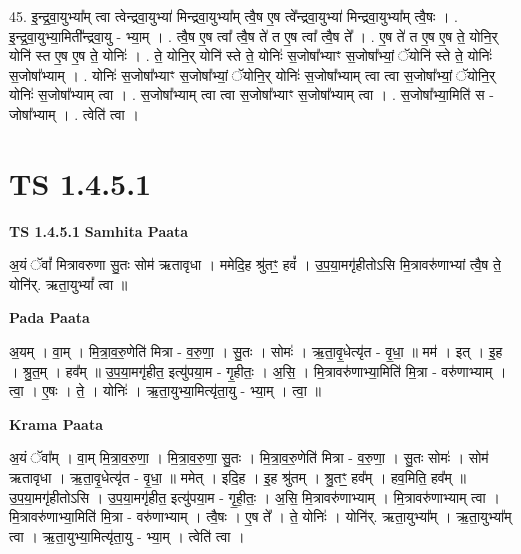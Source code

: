 \documentclass[17pt]{extarticle}
\begin{document}
45. इ॒न्द्र॒वा॒युभ्या᳚म् त्वा त्वेन्द्रवा॒युभ्या॑ मिन्द्रवा॒युभ्या᳚म् त्वै॒ष ए॒ष त्वे᳚न्द्रवा॒युभ्या॑ मिन्द्रवा॒युभ्या᳚म् त्वै॒षः । . इ॒न्द्र॒वा॒युभ्या॒मिती᳚न्द्रवा॒यु - भ्या॒म् । . त्वै॒ष ए॒ष त्वा᳚ त्वै॒ष ते॑ त ए॒ष त्वा᳚ त्वै॒ष ते᳚ । . ए॒ष ते॑ त ए॒ष ए॒ष ते॒ योनि॒र् योनि॑ स्त ए॒ष ए॒ष ते॒ योनिः॑ । . ते॒ योनि॒र् योनि॑ स्ते ते॒ योनिः॑ स॒जोषा᳚भ्याꣳ स॒जोषा᳚भ्यां॒ ॅयोनि॑ स्ते ते॒ योनिः॑ स॒जोषा᳚भ्याम् । . योनिः॑ स॒जोषा᳚भ्याꣳ स॒जोषा᳚भ्यां॒ ॅयोनि॒र् योनिः॑ स॒जोषा᳚भ्याम् त्वा त्वा स॒जोषा᳚भ्यां॒ ॅयोनि॒र् योनिः॑ 
स॒जोषा᳚भ्याम् त्वा । . स॒जोषा᳚भ्याम् त्वा त्वा स॒जोषा᳚भ्याꣳ स॒जोषा᳚भ्याम् त्वा । . स॒जोषा᳚भ्या॒मिति॑ स - जोषा᳚भ्याम् । . त्वेति॑ त्वा । \newline
\pagebreak
{}

\section{ TS 1.4.5.1 }

\textbf{TS 1.4.5.1 } \newline
\textbf{Samhita Paata} \newline

अ॒यं ॅवां᳚ मित्रावरुणा सु॒तः सोम॑ ऋतावृधा । ममेदि॒ह श्रु॑तꣳ॒॒ हवं᳚ । उ॒प॒या॒मगृ॑हीतोऽसि मि॒त्रावरु॑णाभ्यां त्वै॒ष ते॒ योनि॑र्. ऋता॒युभ्यां᳚ त्वा ॥ \newline

\textbf{Pada Paata} \newline

अ॒यम् । वा॒म् । मि॒त्रा॒व॒रु॒णेति॑ मित्रा - व॒रु॒णा॒ । सु॒तः । सोमः॑ । ऋ॒ता॒वृ॒धेत्यृ॑त - वृ॒धा॒ ॥ मम॑ । इत् । इ॒ह । श्रु॒त॒म् । हव᳚म् ॥ उ॒प॒या॒मगृ॑हीत॒ इत्यु॑पया॒म - गृ॒हीतः॒ । अ॒सि॒ । मि॒त्रावरु॑णाभ्या॒मिति॑ मि॒त्रा - वरु॑णाभ्याम् । त्वा॒ । ए॒षः । ते॒ । योनिः॑ । ऋ॒ता॒युभ्या॒मित्यृ॑ता॒यु - भ्या॒म् । त्वा॒ ॥  \newline


\textbf{Krama Paata} \newline

अ॒यं ॅवा᳚म् । वा॒म् मि॒त्रा॒व॒रु॒णा॒ । मि॒त्रा॒व॒रु॒णा॒ सु॒तः । मि॒त्रा॒व॒रु॒णेति॑ मित्रा - व॒रु॒णा॒ । सु॒तः सोमः॑ । सोम॑ ऋतावृधा । ऋ॒ता॒वृ॒धेत्यृ॑त - वृ॒धा॒ ॥ ममेत् । इदि॒ह । इ॒ह श्रु॑तम् । श्रु॒तꣳ॒॒ हव᳚म् । हव॒मिति॒ हव᳚म् ॥ उ॒प॒या॒मगृ॑हीतोऽसि । उ॒प॒या॒मगृ॑हीत॒ इत्यु॑पया॒म - गृ॒ही॒तः॒ । अ॒सि॒ मि॒त्रावरु॑णाभ्याम् । मि॒त्रावरु॑णाभ्याम् त्वा । मि॒त्रावरु॑णाभ्या॒मिति॑ मि॒त्रा - वरु॑णाभ्याम् । त्वै॒षः । ए॒ष ते᳚ । ते॒ योनिः॑ । योनि॑र्. ऋता॒युभ्या᳚म् । ऋ॒ता॒युभ्या᳚म् त्वा । ऋ॒ता॒युभ्या॒मित्यृ॑ता॒यु - भ्या॒म् । त्वेति॑ त्वा । \newline
\end{document}
